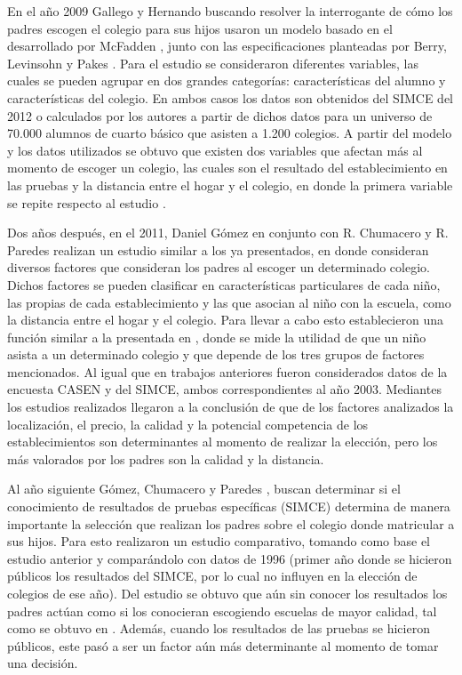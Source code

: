 En el año 2009 Gallego y Hernando \cite{gallego2010school} buscando resolver la interrogante de cómo los padres escogen el colegio para sus hijos usaron un modelo basado en el desarrollado por McFadden \cite{McFadden74}, junto con las especificaciones planteadas por Berry, Levinsohn y Pakes \cite{berry1995automobile}. Para el estudio se consideraron diferentes variables, las cuales se pueden agrupar en dos grandes categorías: características del alumno y características del colegio. En ambos casos los datos son obtenidos del SIMCE del 2012 o calculados por los autores a partir de dichos datos para un universo de 70.000 alumnos de cuarto básico que asisten a 1.200 colegios. A partir del modelo y los datos utilizados se obtuvo que existen dos variables que afectan más al momento de escoger un colegio, las cuales son el resultado del establecimiento en las pruebas y la distancia entre el hogar y el colegio, en donde la primera variable se repite respecto al estudio \cite{SAPELLI2002}.

Dos años después, en el 2011, Daniel Gómez en conjunto con R. Chumacero y R. Paredes \cite{Chumacero20111103} realizan un estudio similar a los ya presentados, en donde consideran diversos factores que consideran los padres al escoger un determinado colegio. Dichos factores se pueden clasificar en características particulares de cada niño, las propias de cada establecimiento y las que asocian al niño con la escuela, como la distancia entre el hogar y el colegio. Para llevar a cabo esto establecieron una función similar a la presentada en \cite{SAPELLI2002}, donde se mide la utilidad de que un niño asista a un determinado colegio y que depende de los tres grupos de factores mencionados. Al igual que en trabajos anteriores fueron considerados datos de la encuesta CASEN y del SIMCE, ambos correspondientes al año 2003. Mediantes los estudios realizados llegaron a la conclusión de que de los factores analizados la localización, el precio, la calidad y la potencial competencia de los establecimientos son determinantes al momento de realizar la elección, pero los más valorados por los padres son la calidad y la distancia.

Al año siguiente Gómez, Chumacero y Paredes \cite{GOMEZ2012}, buscan determinar si el conocimiento de resultados de pruebas específicas (SIMCE) determina de manera importante la selección que realizan los padres sobre el colegio donde matricular a sus hijos. Para esto realizaron un estudio comparativo, tomando como base el estudio anterior y comparándolo con datos de 1996 (primer año donde se hicieron públicos los resultados del SIMCE, por lo cual no influyen en la elección de colegios de ese año). Del estudio se obtuvo que aún sin conocer los resultados los padres actúan como si los conocieran escogiendo escuelas de mayor calidad, tal como se obtuvo en \cite{SAPELLI2002}. Además, cuando los resultados de las pruebas se hicieron públicos, este pasó a ser un factor aún más determinante al momento de tomar una decisión.

